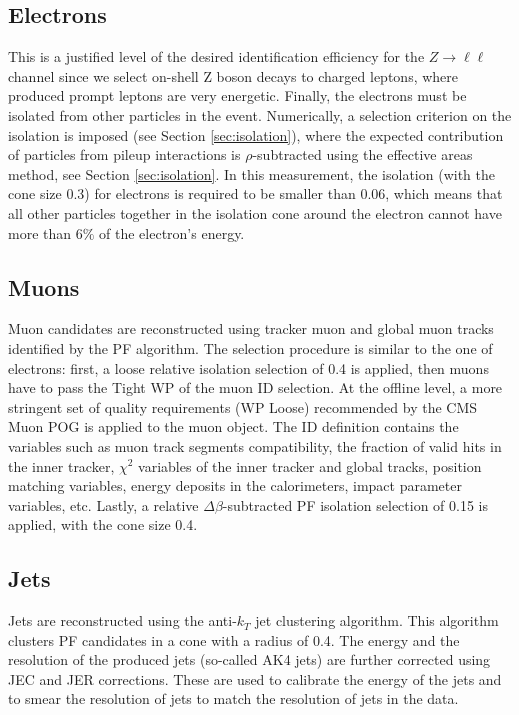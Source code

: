 \subsection{Electrons}\label{sec:EGamma}

This is a justified level of the desired identification efficiency for the $Z \to \ell \ell$ channel since we select on-shell Z boson decays to charged leptons, where produced prompt leptons are very energetic. Finally, the electrons must be isolated from other particles in the event. Numerically, a selection criterion on the isolation is imposed (see Section \ref{sec:isolation}), where the expected contribution of particles from pileup interactions is $\rho$-subtracted using the effective areas method, see Section \ref{sec:isolation}. In this measurement, the isolation (with the cone size 0.3) for electrons is required to be smaller than 0.06, which means that all other particles together in the isolation cone around the electron cannot have more than 6$\%$ of the electron's energy.

\subsection{Muons}\label{sec:muons}
Muon candidates are reconstructed using tracker muon and global muon tracks identified by the PF algorithm. The selection procedure is similar to the one of electrons: first, a loose relative isolation selection of 0.4 is applied, then muons have to pass the Tight WP of the muon ID selection. At the offline level, a more stringent set of quality requirements (WP Loose) recommended by the CMS Muon POG is applied to the muon object. The ID definition contains the variables such as muon track segments compatibility, the fraction of valid hits in the inner tracker, $\chi^2$ variables of the inner tracker and global tracks, position matching variables, energy deposits in the calorimeters, impact parameter variables, etc. Lastly, a relative $\Delta\beta$-subtracted PF isolation selection of 0.15 is applied, with the cone size 0.4.

\subsection{Jets}\label{sec:jets}
Jets are reconstructed using the anti-$k_T$ jet clustering algorithm. This algorithm clusters PF candidates in a cone with a radius of 0.4. The energy and the resolution of the produced jets (so-called AK4 jets) are further corrected using JEC and JER corrections. These are used to calibrate the energy of the jets and to smear the resolution of jets to match the resolution of jets in the data. 

